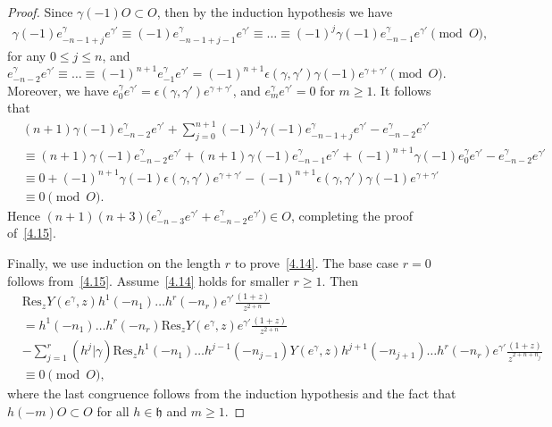 \documentclass[10pt,a4paper]{amsart}
\def \ga {\gamma}
\def \h {\mathfrak{h}}
\def\Res{\mathrm{Res}}
\def\ds{\dots}
\begin{document}
\begin{proof}
		Since $\ga(-1)O\subset O$, then by the induction hypothesis we have \begin{align*} \ga(-1)e^\ga_{-n-1+j}e^{\ga'}\equiv (-1)e^\ga_{-n-1+j-1}e^{\ga'}\equiv \ds\equiv (-1)^j \ga(-1)e^\ga_{-n-1}e^{\ga'}\pmod{O}, \end{align*} for any $0\leq j\leq n$, and $e^\ga_{-n-2}e^{\ga'}\equiv \ds \equiv (-1)^{n+1}e^\ga_{-1}e^{\ga'}=(-1)^{n+1}\epsilon(\ga,\ga')\ga(-1)e^{\ga+\ga'}\pmod{O}$. Moreover, we have $e^{\ga}_{0}e^{\ga'}=\epsilon(\ga,\ga')e^{\ga+\ga'}$, and $e^\ga_{m}e^{\ga'}=0$ for $m\geq 1$.
		It follows that \begin{align*} &(n+1)\ga(-1)e^\ga_{-n-2}e^{\ga'}+\sum_{j=0}^{n+1} (-1)^j\ga(-1) e^\ga_{-n-1+j}e^{\ga'}-e^\ga_{-n-2}e^{\ga'}\\ &\equiv (n+1) \ga(-1)e^{\ga}_{-n-2}e^{\ga'}+(n+1)\ga(-1)e^{\ga}_{-n-1}e^{\ga'}+ (-1)^{n+1} \ga(-1)e^{\ga}_{0}e^{\ga'}-e^\ga_{-n-2}e^{\ga'}\\ &\equiv 0+ (-1)^{n+1} \ga(-1)\epsilon(\ga,\ga')e^{\ga+\ga'}-(-1)^{n+1}\epsilon(\ga,\ga')\ga(-1)e^{\ga+\ga'}\\ &\equiv 0\pmod{O}. \end{align*}
		Hence $(n+1)(n+3)\big(e^\ga_{-n-3}e^{\ga'}+e^\ga_{-n-2}e^{\ga'}\big)\in O$, 
		completing the proof of~\eqref{4.15}.
		
		Finally, we use induction on the length $r$ to prove~\eqref{4.14}.  
		The base case $r=0$ follows from~\eqref{4.15}.  
		Assume~\eqref{4.14} holds for smaller $r\geq 1$. Then \begin{align*} &\Res_z Y(e^\ga,z)h^1(-n_1)\ds h^r(-n_r)e^{\ga'} \frac{(1+z)}{z^{2+n}}\\ &= h^1(-n_1)\ds h^r(-n_r) \Res_z Y(e^\ga,z)e^{\ga'} \frac{(1+z)}{z^{2+n}}\\ &-\sum_{j=1}^r (h^j|\ga) \Res_z h^1(-n_1)\ds h^{j-1}(-n_{j-1}) Y(e^\ga,z)h^{j+1}(-n_{j+1})\ds h^r(-n_r)e^{\ga'} \frac{(1+z)}{z^{2+n+n_j}}\\ &\equiv 0\pmod{O}, \end{align*}
		where the last congruence follows from the induction hypothesis and the fact that 
		$h(-m)O\subset O$ for all $h\in\h$ and $m\geq 1$.
	\end{proof}
\end{document}
